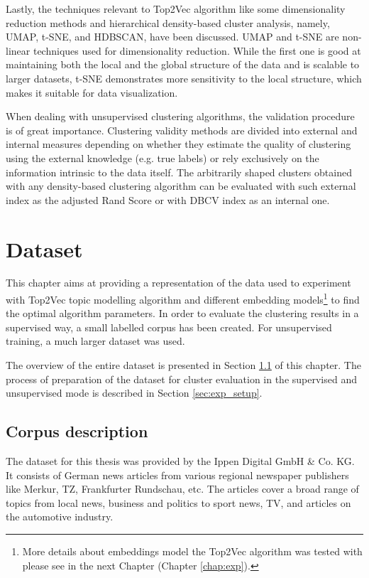 \documentclass[fontsize=12pt,a4paper,twoside,openany]{scrbook}
\begin{document}
Lastly, the techniques relevant to Top2Vec algorithm like some dimensionality reduction methods and hierarchical density-based cluster analysis, namely,  UMAP, t-SNE, and HDBSCAN, have been discussed. UMAP and t-SNE are non-linear techniques used for dimensionality reduction. While the first one is good at maintaining both the local and the global structure of the data and is scalable to larger datasets, t-SNE demonstrates more sensitivity to the local structure, which makes it suitable for data visualization. 

When dealing with unsupervised clustering algorithms, the validation procedure is of great importance. Clustering validity methods are divided into external and internal measures depending on whether they estimate the quality of clustering using the external knowledge (e.g. true labels) or rely exclusively on the information intrinsic to the data itself. The arbitrarily shaped clusters obtained with any density-based clustering algorithm can be evaluated with such external index as the adjusted Rand Score or with DBCV index as an internal one.

\chapter{Dataset}
\label{chap:dataset}
This chapter aims at providing a representation of the data used to experiment with Top2Vec topic modelling algorithm and different embedding models\footnote{More details about embeddings model the Top2Vec algorithm was tested with please see in the next Chapter (Chapter \ref{chap:exp}).} to find the optimal algorithm parameters. In order to evaluate the clustering results in a supervised way, a small labelled corpus has been created. For unsupervised training, a much larger dataset was used. 

The overview of the entire dataset is presented in Section \ref{sec:corp_exploration} of this chapter. The process of preparation of the dataset for cluster evaluation in the supervised and unsupervised mode is described in Section \ref{sec:exp_setup}.

\section{Corpus description}
\label{sec:corp_exploration}

The dataset for this thesis was provided by the Ippen Digital GmbH \& Co. KG. It consists of German news articles from various regional newspaper publishers like Merkur, TZ, Frankfurter Rundschau, etc. The articles cover a broad range of topics from local news, business and politics to sport news, TV, and articles on the automotive industry.
\end{document}
